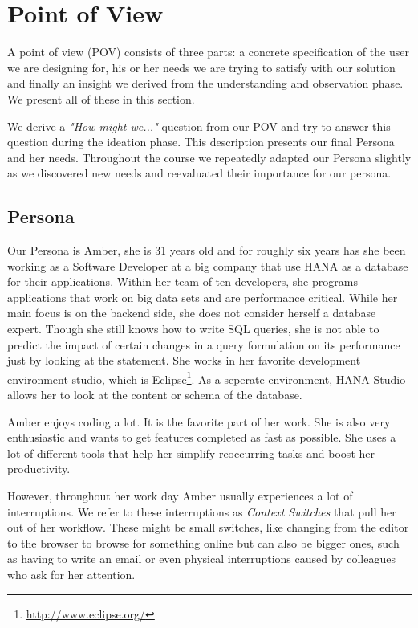 
\section[Point of View (Author: Felix Leupold)]{Point of View} \label{sec:POINT_OF_VIEW}

A point of view (POV) consists of three parts: a concrete specification of the user we are designing for, his or her needs we are trying to satisfy with our solution and finally an insight we derived from the understanding and observation phase. We present all of these in this section.

We derive a \emph{"How might we..."}-question from our POV and try to answer this question during the ideation phase. This description presents our final Persona and her needs. Throughout the course we repeatedly adapted our Persona slightly as we discovered new needs and reevaluated their importance for our persona.

\subsection{Persona}
\label{subsec:persona}

Our Persona is Amber, she is 31 years old and for roughly six years has she been working as a Software Developer at a big company that use HANA as a database for their applications. Within her team of ten developers, she programs applications that work on big data sets and are performance critical. While her main focus is on the backend side, she does not consider herself a database expert. Though she still knows how to write SQL queries, she is not able to predict the impact of certain changes in a query formulation on its performance just by looking at the statement. She works in her favorite development environment studio, which is Eclipse\footnote{\url{http://www.eclipse.org/}}. As a seperate environment, HANA Studio allows her to look at the content or schema of the database.

Amber enjoys coding a lot. It is the favorite part of her work. She is also very enthusiastic and wants to get features completed as fast as possible. She uses a lot of different tools that help her simplify reoccurring tasks and boost her productivity.

However, throughout her work day Amber usually experiences a lot of interruptions. We refer to these interruptions as \emph{Context Switches} that pull her out of her workflow. These might be small switches, like changing from the editor to the browser to browse for something online but can also be bigger ones, such as having to write an email or even physical interruptions caused by colleagues who ask for her attention.

